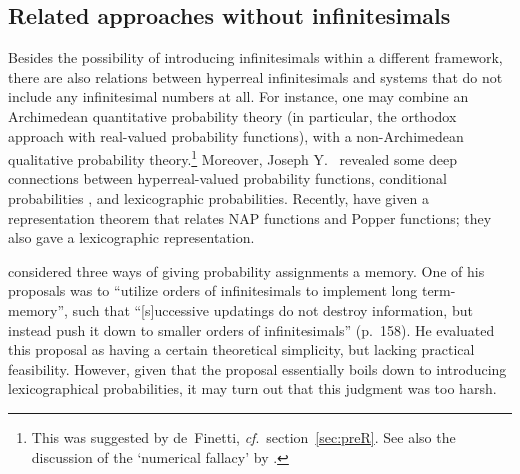 \subsection{Related approaches without infinitesimals}
Besides the possibility of introducing infinitesimals within a different framework, there are also relations between hyperreal infinitesimals and systems that do not include any infinitesimal numbers at all. For instance, one may combine an Archimedean quantitative probability theory (in particular, the orthodox approach with real-valued probability functions), with a non-Archimedean qualitative probability theory.\footnote{This was suggested by de~Finetti, \textit{cf}.\ section~\ref{sec:preR}. See also the discussion of the `numerical fallacy' by \citet{Easwaran:2014}.} Moreover, Joseph Y.~\citet{Halpern:2010} revealed some deep connections between hyperreal-valued probability functions, conditional probabilities \citep[including Popper functions; see also Vann][]{McGee:1994}, and lexicographic probabilities. Recently, \citet{BrickhillHorsten:2018} have given a representation theorem that relates NAP functions and Popper functions; they also gave a lexicographic representation.

\citet{Skyrms:1983b} considered three ways of giving probability assignments a memory. One of his proposals was to ``utilize orders of infinitesimals to implement long term-memory'', such that ``[s]uccessive updatings do not destroy information, but instead push it down to smaller orders of infinitesimals'' (p.~158).
He evaluated this proposal as having a certain theoretical simplicity, but lacking practical feasibility. However, given that the proposal essentially boils down to introducing lexicographical probabilities, it may turn out that this judgment was too harsh.

